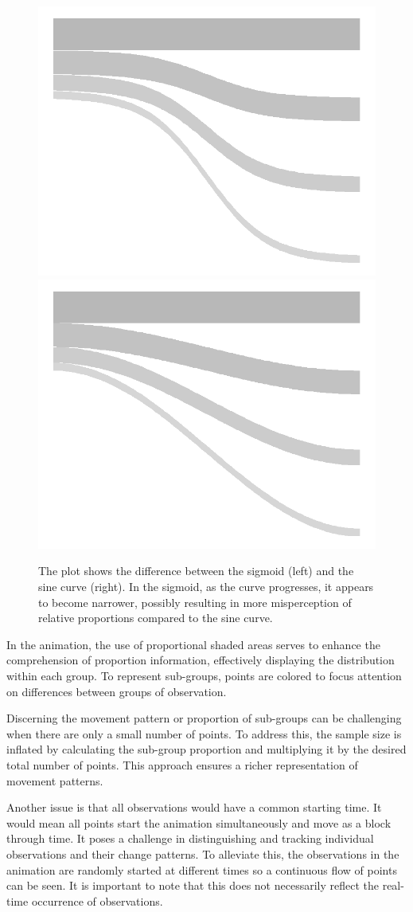 \begin{figure}
\includegraphics[width=0.5\linewidth]{figures/sigmoid-shade} \includegraphics[width=0.5\linewidth]{figures/sine-shade} \caption{The plot shows the difference between the sigmoid (left) and the sine curve (right). In the sigmoid, as the curve progresses, it appears to become narrower, possibly resulting in more misperception of relative proportions compared to the sine curve.}\label{fig:proportional-shade}
\end{figure}

In the animation, the use of proportional shaded areas serves to enhance the comprehension of proportion information, effectively displaying the distribution within each group. To represent sub-groups, points are colored to focus attention on differences between groups of observation.

Discerning the movement pattern or proportion of sub-groups can be challenging when there are only a small number of points. To address this, the sample size is inflated by calculating the sub-group proportion and multiplying it by the desired total number of points. This approach ensures a richer representation of movement patterns.

Another issue is that all observations would have a common starting time. It would mean all points start the animation simultaneously and move as a block through time. It poses a challenge in distinguishing and tracking individual observations and their change patterns. To alleviate this, the observations in the animation are randomly started at different times so a continuous flow of points can be seen. It is important to note that this does not necessarily reflect the real-time occurrence of observations.


